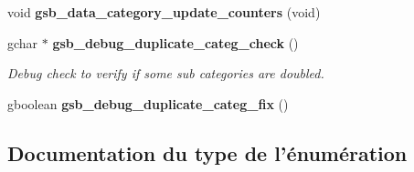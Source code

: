 \begin{DoxyCompactItemize}
\item 
void {\bf gsb\_\-data\_\-category\_\-update\_\-counters} (void)
\item 
gchar $\ast$ {\bf gsb\_\-debug\_\-duplicate\_\-categ\_\-check} ()
\begin{DoxyCompactList}\small\item\em Debug check to verify if some sub categories are doubled. \item\end{DoxyCompactList}\item 
gboolean {\bf gsb\_\-debug\_\-duplicate\_\-categ\_\-fix} ()
\end{DoxyCompactItemize}


\subsection{Documentation du type de l'énumération}
